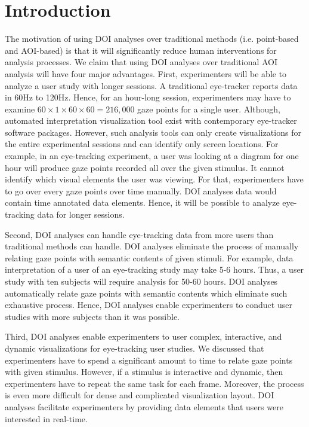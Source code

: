 \section{Introduction}
The motivation of using DOI analyses over traditional methods (i.e. point-based and AOI-based) is that it will significantly reduce human interventions for analysis processes. We claim that using DOI analyses over traditional AOI analysis will have four major advantages. First, experimenters will be able to analyze a user study with longer sessions. A traditional eye-tracker reports data in 60Hz to 120Hz. Hence, for an hour-long session, experimenters may have to examine $ 60 \times 1 \times 60 \times 60 =216,000$ gaze points for a single user. Although, automated interpretation visualization tool exist with contemporary eye-tracker software packages. However, such analysis tools can only create visualizations for the entire experimental sessions and can identify only screen locations. For example, in an eye-tracking experiment, a user was looking at a diagram for one hour will produce gaze points recorded all over the given stimulus. It cannot identify which visual elements the user was viewing. For that, experimenters have to go over every gaze points over time manually. DOI analyses data would contain time annotated data elements. Hence, it will be possible to analyze eye-tracking data for longer sessions.  

Second, DOI analyses can handle eye-tracking data from more users than traditional methods can handle. DOI analyses eliminate the process of manually relating gaze points with semantic contents of given stimuli.  For example, data interpretation of a user of an eye-tracking study may take 5-6 hours. Thus, a user study with ten subjects will require analysis for 50-60 hours. DOI analyses automatically relate gaze points with semantic contents which eliminate such exhaustive process. Hence, DOI analyses enable experimenters to conduct user studies with more subjects than it was possible.

Third, DOI analyses enable experimenters to user complex, interactive, and dynamic visualizations for eye-tracking user studies. We discussed that experimenters have to spend a significant amount to time to relate gaze points with given stimulus. However, if a stimulus is interactive and dynamic, then experimenters have to repeat the same task for each frame. Moreover, the process is even more difficult for dense and complicated visualization layout. DOI analyses facilitate experimenters by providing data elements that users were interested in real-time.

